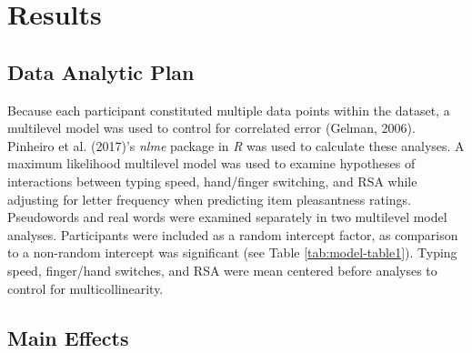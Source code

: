 \documentclass[
  english,
  man]{apa7}
\begin{document}
\hypertarget{results}{%
\section{Results}\label{results}}

\hypertarget{data-analytic-plan}{%
\subsection{Data Analytic Plan}\label{data-analytic-plan}}

Because each participant constituted multiple data points within the dataset, a multilevel model was used to control for correlated error (Gelman, 2006). Pinheiro et al. (2017)'s \emph{nlme} package in \emph{R} was used to calculate these analyses. A maximum likelihood multilevel model was used to examine hypotheses of interactions between typing speed, hand/finger switching, and RSA while adjusting for letter frequency when predicting item pleasantness ratings. Pseudowords and real words were examined separately in two multilevel model analyses. Participants were included as a random intercept factor, as comparison to a non-random intercept was significant (see Table \ref{tab:model-table1}). Typing speed, finger/hand switches, and RSA were mean centered before analyses to control for multicollinearity.

\hypertarget{main-effects}{%
\subsection{Main Effects}\label{main-effects}}
\end{document}
